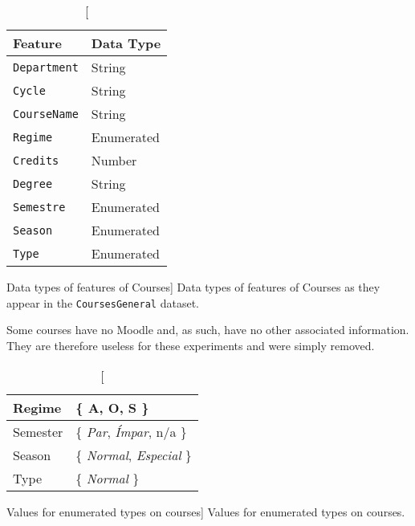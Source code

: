 \begin{table}[h!]
    \centering

    \begin{tabular}{l l}
        Feature             & Data Type  \\ \hline
        \texttt{Department} & String     \\
        \texttt{Cycle}      & String     \\
        \texttt{CourseName} & String     \\
        \texttt{Regime}     & Enumerated \\
        \texttt{Credits}    & Number     \\
        \texttt{Degree}     & String     \\
        \texttt{Semestre}   & Enumerated \\
        \texttt{Season}     & Enumerated \\
        \texttt{Type}       & Enumerated \\
    \end{tabular}

    \caption
        [Data types of features of Courses]
        {Data types of features of Courses as they appear in the
        \texttt{CoursesGeneral} dataset.}

    \label{tab:courses_general_features}
\end{table}

Some courses have no Moodle and, as such, have no other associated information.
They are therefore useless for these experiments and were simply removed.

\begin{table}[h!]
    \centering

    \begin{tabular}{| l | l |}
        \hline
        Regime   & \{ A, O, S \}                            \\ \hline
        Semester & \{ \textit{Par}, \textit{Ímpar}, n/a \}  \\ \hline
        Season   & \{ \textit{Normal}, \textit{Especial} \} \\ \hline
        Type     & \{ \textit{Normal} \}                    \\ \hline
    \end{tabular}

    \caption
        [Values for enumerated types on courses]
        {Values for enumerated types on courses.}

    \label{tab:courses_enum}
\end{table}

